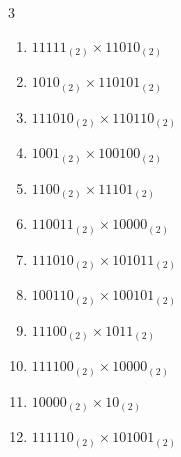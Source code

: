 \begin{multicols}{3}
\begin{enumerate}

  \item $11111_{(2)} \times 11010_{(2)}$


\columnbreak %

  \item $1010_{(2)} \times 110101_{(2)}$


  \item $111010_{(2)} \times 110110_{(2)}$


  \item $1001_{(2)} \times 100100_{(2)}$


  \item $1100_{(2)} \times 11101_{(2)}$


  \item $110011_{(2)} \times 10000_{(2)}$


\columnbreak %

  \item $111010_{(2)} \times 101011_{(2)}$


  \item $100110_{(2)} \times 100101_{(2)}$


  \item $11100_{(2)} \times 1011_{(2)}$


  \item $111100_{(2)} \times 10000_{(2)}$


  \item $10000_{(2)} \times 10_{(2)}$


\columnbreak %

\resetques

  \item $111110_{(2)} \times 101001_{(2)}$


\end{enumerate}
\end{multicols}
